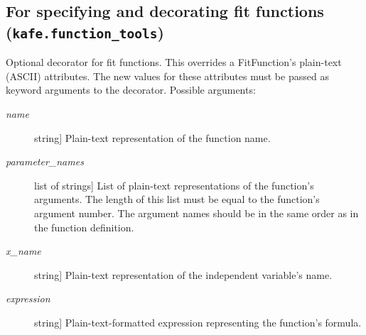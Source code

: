 \documentclass[a4paper,10pt,english]{sphinxmanual}
\begin{document}
\subsection{For specifying and decorating fit functions (\texttt{kafe.function\_tools})}
\label{module_doc:module-kafe.function_tools}\label{module_doc:for-specifying-and-decorating-fit-functions-kafe-function-tools}\label{module_doc:module-function_tools}

\begin{fulllineitems}
\label{module_doc:kafe.function_tools.ASCII}
Optional decorator for fit functions. This overrides a FitFunction's
plain-text (ASCII) attributes. The new values for these attributes must be
passed as keyword arguments to the decorator. Possible arguments:
\begin{description}
\item[{\emph{name}}] \leavevmode{[}string{]}
Plain-text representation of the function name.

\item[{\emph{parameter\_names}}] \leavevmode{[}list of strings{]}
List of plain-text representations of the function's arguments.
The length of this list must be equal to the function's argument
number. The argument names should be in the same order as in the
function definition.

\item[{\emph{x\_name}}] \leavevmode{[}string{]}
Plain-text representation of the independent variable's name.

\item[{\emph{expression}}] \leavevmode{[}string{]}
Plain-text-formatted expression representing the
function's formula.

\end{description}

\end{fulllineitems}

\end{document}
